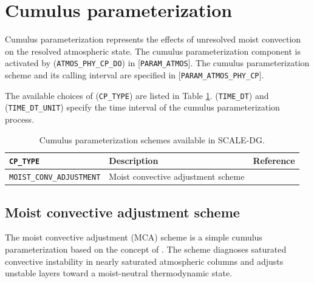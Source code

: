 \section{Cumulus parameterization}

Cumulus parameterization represents the effects of unresolved moist convection on the resolved atmospheric state.
The cumulus parameterization component is activated by (\verb|ATMOS_PHY_CP_DO|) in [\verb|PARAM_ATMOS|].
The cumulus parameterization scheme and its calling interval are specified in [\verb|PARAM_ATMOS_PHY_CP|].


The available choices of (\verb|CP_TYPE|) are listed in Table \ref{tab:cp_scheme_list}.
(\verb|TIME_DT|) and (\verb|TIME_DT_UNIT|) specify the time interval of the cumulus parameterization process.

\begin{table}[htbp]
\caption{Cumulus parameterization schemes available in SCALE-DG.}
\label{tab:cp_scheme_list}
\begin{center}
\begin{tabularx}{150mm}{lXX}
\hline
\rowcolor[gray]{0.9}
\verb|CP_TYPE| & Description & Reference \\
\hline
\verb|MOIST_CONV_ADJUSTMENT| & Moist convective adjustment scheme & \cite{manabe1965} \\
\hline
\end{tabularx}
\end{center}
\end{table}


\subsection{Moist convective adjustment scheme}
The moist convective adjustment (MCA) scheme is a simple cumulus parameterization based on the concept of \cite{manabe1965}.
The scheme diagnoses saturated convective instability in nearly saturated atmospheric columns and adjusts unstable layers toward a moist-neutral thermodynamic state.


